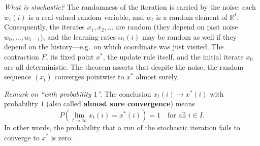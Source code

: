 \documentclass[11pt]{article}
\begin{document}
\emph{What is stochastic?}
The randomness of the iteration is carried by the noise: each $w_t(i)$ is a real-valued random variable, and $w_t$ is a random element of $\mathbb{R}^I$. Consequently, the iterates $x_1, x_2, \ldots$ are random (they depend on past noise $w_0, \ldots, w_{t-1}$), and the learning rates $\alpha_t(i)$ may be random as well if they depend on the history---e.g.\ on which coordinate was just visited. The contraction $F$, its fixed point $x^*$, the update rule itself, and the initial iterate $x_0$ are all deterministic. The theorem asserts that despite the noise, the random sequence $(x_t)$ converges pointwise to $x^*$ almost surely.

\emph{Remark on ``with probability $1$''.}
The conclusion $x_t(i) \to x^*(i)$ with probability $1$ (also called \textbf{almost sure convergence}) means
$$
P\!\left(\lim_{t \to \infty} x_t(i) = x^*(i)\right) = 1 \quad \text{for all } i \in I.
$$
In other words, the probability that a run of the stochastic iteration fails to converge to $x^*$ is zero.




\end{document}

